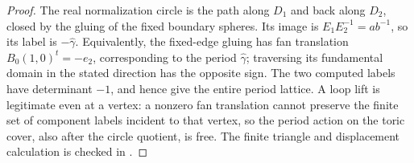 \begin{proof}
The real normalization circle is the path along \(D_1\)
and back along \(D_2\), closed by the gluing of the fixed
boundary spheres. Its image is \(E_1E_2^{-1}=ab^{-1}\),
so its label is \(-\widehat\gamma\). Equivalently, the
fixed-edge gluing has fan translation
\(B_0(1,0)^t=-e_2\), corresponding to the period
\(\widehat\gamma\); traversing its fundamental
domain in the stated direction has the opposite sign.
The two computed labels have determinant \(-1\), and hence
give the entire period lattice. A loop lift is legitimate even
at a vertex: a nonzero fan translation cannot preserve the finite
set of component labels incident to that vertex, so the period
action on the toric cover, also after the circle quotient, is free.
The finite triangle and displacement calculation is checked in
.
\end{proof}

